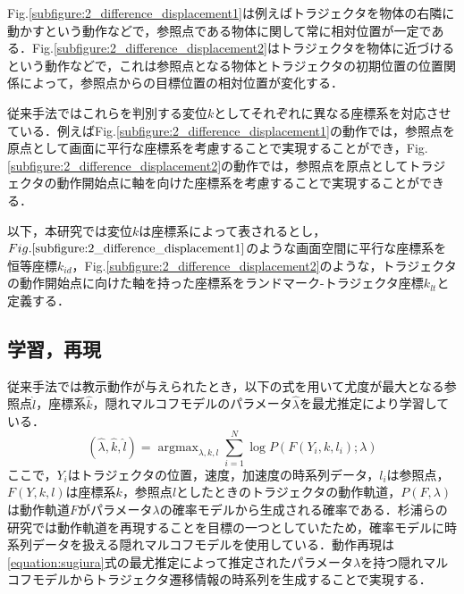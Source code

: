 \clearpage
Fig.\ref{subfigure:2_difference_displacement1}は例えばトラジェクタを物体の右隣に動かすという動作などで，参照点である物体に関して常に相対位置が一定である．Fig.\ref{subfigure:2_difference_displacement2}はトラジェクタを物体に近づけるという動作などで，これは参照点となる物体とトラジェクタの初期位置の位置関係によって，参照点からの目標位置の相対位置が変化する．

従来手法ではこれらを判別する変位$k$としてそれぞれに異なる座標系を対応させている．例えばFig.\ref{subfigure:2_difference_displacement1}の動作では，参照点を原点として画面に平行な座標系を考慮することで実現することができ，Fig.\ref{subfigure:2_difference_displacement2}の動作では，参照点を原点としてトラジェクタの動作開始点に軸を向けた座標系を考慮することで実現することができる．

以下，本研究では変位$k$は座標系によって表されるとし，$Fig.\ref{subfigure:2_difference_displacement1}$のような画面空間に平行な座標系を恒等座標$k_{id}$，Fig.\ref{subfigure:2_difference_displacement2}のような，トラジェクタの動作開始点に向けた軸を持った座標系をランドマーク-トラジェクタ座標$k_{lt}$と定義する．

\subsection{学習，再現}

従来手法では教示動作が与えられたとき，以下の式を用いて尤度が最大となる参照点$\hat{l}$，座標系$\hat{k}$，隠れマルコフモデルのパラメータ$\hat{λ}$を最尤推定により学習している．
\begin{equation}
	\label{equation:sugiura}
	(\hat{λ} , \hat{k} , \hat{l}) = \mathop{\arg\max}_{λ , k , l}\sum_{i=1}^{N}\log P(F(Y_{i} , k , l_{i}) ; λ)
\end{equation}
ここで，$Y_{i}$はトラジェクタの位置，速度，加速度の時系列データ，$l_{i}$は参照点，$F(Y , k , l)$は座標系$k$，参照点$l$としたときのトラジェクタの動作軌道，$P(F,λ)$は動作軌道$F$がパラメータ$λ$の確率モデルから生成される確率である．杉浦らの研究では動作軌道を再現することを目標の一つとしていたため，確率モデルに時系列データを扱える隠れマルコフモデルを使用している．動作再現は\ref{equation:sugiura}式の最尤推定によって推定されたパラメータ$λ$を持つ隠れマルコフモデルからトラジェクタ遷移情報の時系列を生成することで実現する．
